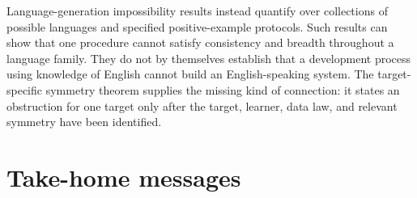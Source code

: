 \documentclass[11pt,twoside]{article}
\theoremstyle{definition}
\theoremstyle{remark}
\begin{document}
Language-generation impossibility results instead quantify over collections
of possible languages and specified positive-example protocols. Such results
can show that one procedure cannot satisfy consistency and breadth throughout
a language family. They do not by themselves establish that a development
process using knowledge of English cannot build an English-speaking system.
The target-specific symmetry theorem supplies the missing kind of connection:
it states an obstruction for one target only after the target, learner, data
law, and relevant symmetry have been identified.

\section{Take-home messages}
\label{sec:take-home}
\end{document}
